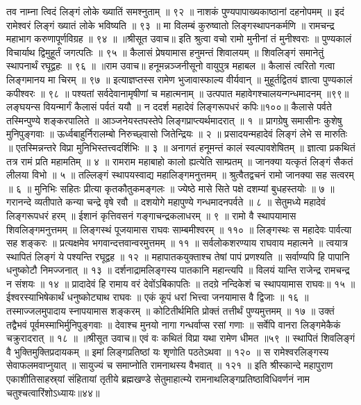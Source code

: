 तव नाम्ना त्विदं लिङ्गं लोके ख्यातिं समश्नुताम् ॥ ९२ ॥
नाशकं पुण्यपापाख्यकाष्ठानां दहनोपमम् ॥
इदं रामेश्वरं लिङ्गं ख्यातं लोके भविष्यति ॥ ९३ ॥
मा विलम्बं कुरुष्वातो लिङ्गस्थापनकर्मणि ॥
रामचन्द्र महाभाग करुणापूर्णविग्रह ॥ ९४ ॥
॥श्रीसूत उवाच॥
इति श्रुत्वा वचो रामो मुनीनां तं मुनीश्वराः ॥
पुण्यकालं विचार्याथ द्विमुहूर्तं जगत्पतिः ॥ ९५ ॥
कैलासं प्रेषयामास हनुमन्तं शिवालयम् ॥
शिवलिङ्गं समानेतुं स्थापनार्थं रघूद्वहः ॥ ९६ ॥
॥राम उवाच॥
हनूमन्नञ्जनीसूनो वायुपुत्र महाबल ॥
कैलासं त्वरितो गत्वा लिङ्गमानय मा चिरम् ॥ ९७ ॥
इत्याज्ञप्तस्स रामेण भुजावास्फाल्य वीर्यवान् ॥
मुहूर्तद्वितयं ज्ञात्वा पुण्यकालं कपीश्वरः ॥ ९८ ॥
पश्यतां सर्वदेवानामृषीणां च महात्मनाम् ॥
उत्पपात महावेगश्चालयन्गन्धमादनम् ॥९९॥
लङ्घयन्स वियन्मार्गं कैलासं पर्वतं ययौ ॥
न ददर्श महादेवं लिङ्गरूपधरं कपिः॥१००॥
कैलासे पर्वते तस्मिन्पुण्ये शङ्करपालिते ॥
आञ्जनेयस्तपस्तेपे लिङ्गप्राप्त्यर्थमादरात् ॥ १ ॥
प्रागग्रेषु समासीनः कुशेषु मुनिपुङ्गवाः ॥
ऊर्ध्वबाहुर्निरालम्बो निरुच्छ्वासो जितेन्द्रियः ॥ २ ॥
प्रसादयन्महादेवं लिङ्गं लेभे स मारुतिः ॥
एतस्मिन्नन्तरे विप्रा मुनिभिस्तत्त्वदर्शिभिः ॥ ३ ॥
अनागतं हनूमन्तं कालं स्वल्पावशेषितम् ॥
ज्ञात्वा प्रकथितं तत्र रामं प्रति महामतिम् ॥ ४ ॥
रामराम महाबाहो कालो ह्यत्येति साम्प्रतम् ॥
जानक्या यत्कृतं लिङ्गं सैकतं लीलया विभो ॥ ५ ॥
तल्लिङ्गं स्थापयस्वाद्य महालिङ्गमनुत्तमम् ॥
श्रुत्वैतद्वचनं रामो जानक्या सह सत्वरम् ॥ ६ ॥
मुनिभिः सहितः प्रीत्या कृतकौतुकमङ्गलः ॥
ज्येष्ठे मासे सिते पक्षे दशम्यां बुधहस्तयोः ॥ ७ ॥
गरानन्दे व्यतीपाते कन्या चन्द्रे वृषे रवौ ॥
दशयोगे महापुण्ये गन्धमादनपर्वते ॥ ८ ॥
सेतुमध्ये महादेवं लिङ्गरूपधरं हरम् ॥
ईशानं कृत्तिवसनं गङ्गाचन्द्रकलाधरम् ॥ ९ ॥
रामो वै स्थापयामास शिवलिङ्गमनुत्तमम् ॥
लिङ्गस्थं पूजयामास राघवः साम्बमीश्वरम् ॥ ११० ॥
लिङ्गस्थः स महादेवः पार्वत्या सह शङ्करः ॥
प्रत्यक्षमेव भगवान्दत्तवान्वरमुत्तमम् ॥ ११ ॥
सर्वलोकशरण्याय राघवाय महात्मने ॥
त्वयात्र स्थापितं लिङ्गं ये पश्यन्ति रघूद्वह ॥ १२ ॥
महापातकयुक्ताश्च तेषां पापं प्रणश्यति ॥
सर्वाण्यपि हि पापानि धनुष्कोटौ निमज्जनात् ॥ १३ ॥
दर्शनाद्रामलिङ्गस्य पातकानि महान्त्यपि ॥
विलयं यान्ति राजेन्द्र रामचन्द्र न संशयः ॥ १४ ॥
प्रादादेवं हि रामाय वरं देवोंऽबिकापतिः ॥
तदग्रे नन्दिकेशं च स्थापयामास राघवः॥ १५ ॥
ईश्वरस्याभिषेकार्थं धनुष्कोट्याथ राघवः ॥
एकं कूपं धरां भित्त्वा जनयामास वै द्विजाः ॥ १६ ॥
तस्माज्जलमुपादाय स्नापयामास शङ्करम् ॥
कोटितीर्थमिति प्रोक्तं तत्तीर्थं पुण्यमुत्तमम् ॥ १७ ॥
उक्तं तद्वैभवं पूर्वमस्माभिर्मुनिपुङ्गवाः ॥
देवाश्च मुनयो नागा गन्धर्वाप्स रसां गणाः ॥
सर्वेपि वानरा लिङ्गमेकैकं चक्रुरादरात् ॥ १८ ॥
॥श्रीसूत उवाच॥
एवं वः कथितं विप्रा यथा रामेण धीमत ॥५९ ॥
स्थापितं शिवलिङ्गं वै भुक्तिमुक्तिप्रदायकम् ॥
इमां लिङ्गप्रतिष्ठां यः शृणोति पठतेऽथवा ॥ १२० ॥
स रामेश्वरलिङ्गस्य सेवाफलमवाप्नुयात् ॥
सायुज्यं च समाप्नोति रामनाथस्य वैभवात् ॥ १२१ ॥
इति श्रीस्कान्दे महापुराण एकाशीतिसाहस्र्यां संहितायां तृतीये ब्रह्मखण्डे सेतुमाहात्म्ये रामनाथलिङ्गप्रतिष्ठाविधिवर्णनं नाम चतुश्चत्वारिंशोऽध्यायः॥४४॥


